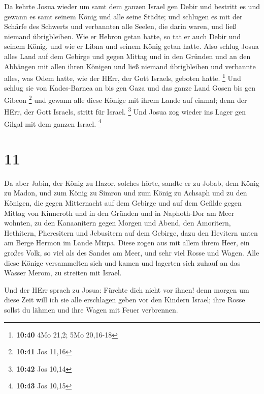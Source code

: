  Da kehrte Josua wieder um samt dem ganzen Israel gen Debir
und bestritt es  und gewann es samt seinem König und alle
seine Städte; und schlugen es mit der Schärfe des Schwerts und
verbannten alle Seelen, die darin waren, und ließ niemand übrigbleiben.
Wie er Hebron getan hatte, so tat er auch Debir und seinem König, und
wie er Libna und seinem König getan hatte.  Also schlug
Josua alles Land auf dem Gebirge und gegen Mittag und in den Gründen und
an den Abhängen mit allen ihren Königen und ließ niemand übrigbleiben
und verbannte alles, was Odem hatte, wie der HErr, der Gott Israels,
geboten hatte. \footnote{\textbf{10:40} 4Mo 21,2; 5Mo 20,16-18}
 Und schlug sie von Kades-Barnea an bis gen Gaza und das
ganze Land Gosen bis gen Gibeon \footnote{\textbf{10:41} Jos 11,16}
 und gewann alle diese Könige mit ihrem Lande auf einmal;
denn der HErr, der Gott Israels, stritt für Israel. \footnote{\textbf{10:42}
  Jos 10,14}  Und Josua zog wieder ins Lager gen Gilgal mit
dem ganzen Israel. \footnote{\textbf{10:43} Jos 10,15}

\hypertarget{section-3}{%
\section{11}\label{section-3}}

 Da aber Jabin, der König zu Hazor, solches hörte, sandte er
zu Jobab, dem König zu Madon, und zum König zu Simron und zum König zu
Achsaph  und zu den Königen, die gegen Mitternacht auf dem
Gebirge und auf dem Gefilde gegen Mittag von Kinneroth und in den
Gründen und in Naphoth-Dor am Meer wohnten,  zu den
Kanaanitern gegen Morgen und Abend, den Amoritern, Hethitern,
Pheresitern und Jebusitern auf dem Gebirge, dazu den Hevitern unten am
Berge Hermon im Lande Mizpa.  Diese zogen aus mit allem
ihrem Heer, ein großes Volk, so viel als des Sandes am Meer, und sehr
viel Rosse und Wagen.  Alle diese Könige versammelten sich
und kamen und lagerten sich zuhauf an das Wasser Merom, zu streiten mit
Israel.

 Und der HErr sprach zu Josua: Fürchte dich nicht vor ihnen!
denn morgen um diese Zeit will ich sie alle erschlagen geben vor den
Kindern Israel; ihre Rosse sollst du lähmen und ihre Wagen mit Feuer
verbrennen.


